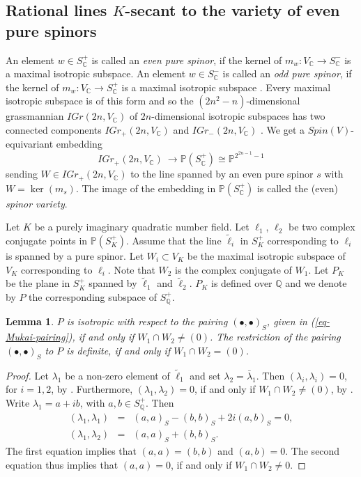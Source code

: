 \documentclass[12pt]{amsart}
\numberwithin{equation}{subsection}
\theoremstyle{plain}
\newtheorem{lem}[thm]{Lemma}
\theoremstyle{definition}
\newcommand{\CC}{{\mathbb C}}
\newcommand{\QQ}{{\mathbb Q}}
\newcommand{\PP}{{\mathbb P}}
\begin{document}
\subsection{Rational lines $K$-secant to the variety of even pure spinors}
\label{sec-pure-spinors}
An element $w\in S^+_\CC$ is called an {\em even pure spinor}, if the kernel of $m_w:V_\CC\rightarrow S^-_\CC$ is a maximal isotropic subspace. An element 
$w\in S^-_\CC$ is called an {\em odd pure spinor}, if the kernel of $m_w:V_\CC\rightarrow S^+_\CC$ is a maximal isotropic subspace \cite[III.1.4]{chevalley}. 
Every maximal isotropic subspace is of this form and so the $(2n^2-n)$-dimensional grassmannian $IGr(2n,V_\CC)$ of $2n$-dimensional isotropic subspaces has two connected components $IGr_+(2n,V_\CC)$ and $IGr_-(2n,V_\CC)$ \cite[III.1.5]{chevalley}. 
We get a $Spin(V)$-equivariant embedding 
\[
IGr_+(2n,V_\CC) \ \rightarrow \PP(S^+_\CC)\cong \PP^{2^{2n-1}-1}
\]
sending $W\in IGr_+(2n,V_\CC)$ to the line spanned by an even pure spinor $s$ with $W=\ker(m_s)$.
The image of the embedding in $\PP(S^+_\CC)$ is called the (even) {\em spinor variety}.

Let $K$ be a purely imaginary quadratic number field. 
Let $\ell_1$, $\ell_2$ be two complex conjugate points in $\PP(S^+_K)$. Assume that the line $\tilde{\ell}_i$ in $S^+_K$ corresponding to $\ell_i$ is spanned by a pure spinor.
 Let $W_i\subset V_K$ be the maximal isotropic subspace of $V_K$ corresponding to $\ell_i$. Note that $W_2$ is the complex conjugate of $W_1$. 
 Let $P_K$ be the plane in $S^+_K$ spanned by $\tilde{\ell}_1$ and $\tilde{\ell}_2$. 
 $P_K$ is defined over $\QQ$ and we denote by $P$ the corresponding subspace of $S^+_\QQ$. 

\begin{lem}
\label{lemma-P-is-non-isotropic-iff-W-1-and-W-2-are-transversal}
$P$ is isotropic with respect to the pairing $(\bullet,\bullet)_S$, given in (\ref{eq-Mukai-pairing}), if and only if $W_1\cap W_2\neq (0)$.
The restriction of the pairing $(\bullet,\bullet)_S$ to $P$ is definite, if and only if $W_1\cap W_2= (0)$.
\end{lem}

\begin{proof}
Let $\lambda_1$ be a non-zero element of $\tilde{\ell}_1$ and set $\lambda_2=\bar{\lambda}_1$. 
Then $(\lambda_i,\lambda_i)=0$, for $i=1,2$, by \cite[III.2.4]{chevalley}.
Furthermore, $(\lambda_1,\lambda_2)=0$, if and only if $W_1\cap W_2\neq (0)$, by \cite[III.2.4]{chevalley}.
Write $\lambda_1=a+ib$, with $a,b\in S^+_\QQ$. Then 
\begin{eqnarray*}
(\lambda_1,\lambda_1)&=& (a,a)_S-(b,b)_S+2i(a,b)_S=0,
\\
(\lambda_1,\lambda_2)&=& (a,a)_S+(b,b)_S.
\end{eqnarray*}
The first equation implies that $(a,a)=(b,b)$ and $(a,b)=0$. The second equation thus implies that $(a,a)=0$, if and only if $W_1\cap W_2\neq 0$.
\end{proof}
 
\end{document}
